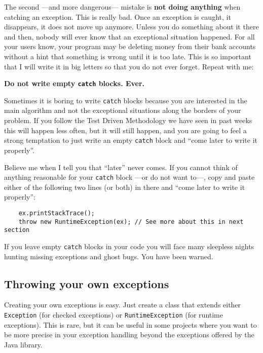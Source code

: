 The second ---and more dangerous--- mistake is \textbf{not doing anything} when
catching an exception. This is really bad. Once an exception is
caught, it disappears, it does not move up anymore. Unless you do
something about it there and then, nobody will ever know that an exceptional
situation happened. For all your users know, your program may be
deleting money from their bank accounts without a hint that something
is wrong until it is too late. This is so important that I will write
it in big letters so that you do not ever forget. Repeat with me: 

\begin{center}  
{\large \bf Do not write empty \verb+catch+ blocks. Ever. }
\end{center}

Sometimes it is boring to write \verb+catch+ blocks because you are
interested in the main algorithm and not the exceptional situations
along the borders of your problem. If you follow the Test Driven
Methodology we have seen in past weeks this will happen less often,
but it will still happen, and you are going to feel a strong
temptation to just write
an empty \verb+catch+ block and ``come later to write it
properly''. 

Believe me when I tell you that ``later'' never comes. If you cannot
think of anything reasonable for your \verb+catch+ block ---or do not
want to---, copy and paste either of the following two lines (or
both) in there and ``come later to write it properly'': 

\begin{verbatim}
    ex.printStackTrace();
    throw new RuntimeException(ex); // See more about this in next section
\end{verbatim}

If you leave empty \verb+catch+ blocks in your code you will face many
sleepless nights hunting missing exceptions and ghost bugs. You have
been warned. 

\subsection{Throwing your own exceptions}
\label{sec:throwing-your-own}

Creating your own exceptions is easy. Just create a class that extends
either \verb+Exception+ (for checked exceptions) or
\verb+RuntimeException+ (for runtime exceptions). This is rare, 
but it can be
useful in some projects where you want to be more precise in your
exception handling beyond the exceptions offered by the Java library.

